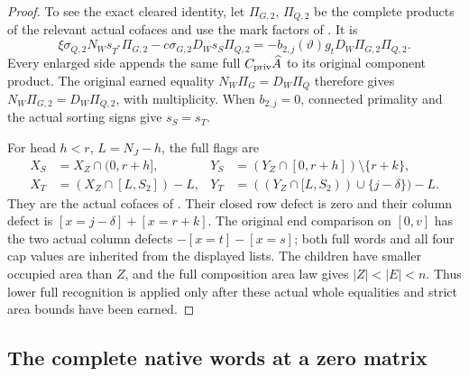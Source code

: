 \documentclass[11pt,a4paper]{amsart}
\numberwithin{equation}{section}
\theoremstyle{plain}
\theoremstyle{definition}
\begin{document}
\begin{proof}
To see the exact cleared identity, let \(\Pi_{G,2}\), \(\Pi_{Q,2}\)
be the complete products of the relevant actual cofaces and use the
mark factors of .  It is
\[
 \xi\sigma_{Q,2}N_Ws_{T^*}\Pi_{G,2}
 -c\sigma_{G,2}D_Ws_S\Pi_{Q,2}
  =-b_{2,j}(\vartheta)g_tD_W\Pi_{G,2}\Pi_{Q,2}.
\]
Every enlarged side appends the same full
\(C_{\rm priv}\widehat A\) to its original component product.
The original earned equality
\(N_W\Pi_G=D_W\Pi_Q\) therefore gives
\(N_W\Pi_{G,2}=D_W\Pi_{Q,2}\), with multiplicity.
When \(b_{2,j}=0\), connected primality and the actual sorting signs
give \(s_S=s_T\).

For head \(h<r\), \(L=N_J-h\), the full flags are
\[
 \begin{aligned}
 X_S&=X_Z\cap(0,r+h],&
 Y_S&=(Y_Z\cap[0,r+h])\setminus\{r+k\},\\
 X_T&=(X_Z\cap[L,S_2])-L,&
 Y_T&=((Y_Z\cap[L,S_2))\cup\{j-\delta\})-L.
 \end{aligned}
\]
They are the actual cofaces of .
Their closed row defect is zero and their column defect is
\([x=j-\delta]+[x=r+k]\).
The original end comparison on \([0,v]\) has the two actual column
defects \(-[x=t]-[x=s]\); both full words and all four cap values
are inherited from the displayed lists.
The children have smaller occupied area than \(Z\), and the full
composition area law gives \(|Z|<|E|<n\).
Thus lower full recognition is applied only after these actual whole
equalities and strict area bounds have been earned.
\end{proof}

\subsection{The complete native words at a zero matrix}
\end{document}
